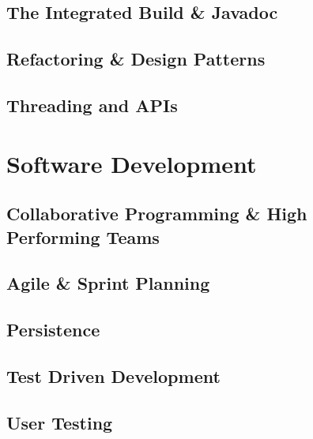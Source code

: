 \documentclass{article}
\begin{document}
\subsection{The Integrated Build & Javadoc}

\subsection{Refactoring & Design Patterns}

\subsection{Threading and APIs}

\newpage
\section{Software Development}

\subsection{Collaborative Programming & High Performing Teams}

\subsection{Agile & Sprint Planning}

\subsection{Persistence}

\subsection{Test Driven Development}

\subsection{User Testing}
\end{document}
